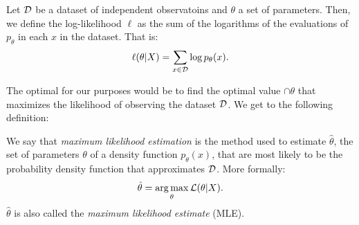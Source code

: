 \begin{ndef}
Let $\mathcal{D}$ be a dataset of independent observatoins and $\theta$ a set of parameters. Then, we define the log-likelihood $\ell$ as the sum of the logarithms of the evaluations of $p_\theta$ in each $x$ in the dataset. That is:
\[
\ell (\theta | X) = \sum_{x \in \mathcal{D}} \log p_\theta(x).
\]
\end{ndef}

The optimal for our purposes would be to find the optimal value $\cap{\theta}$ that maximizes the likelihood of observing the dataset $\mathcal{D}$. We get to the following definition:

\begin{ndef}
We say that \emph{maximum likelihood estimation} is the method used to estimate $\hat \theta$, the set of parameters $\theta$ of a density function
$p_\theta (x)$, that are most likely to be the probability density function that approximates $\mathcal{D}$. More formally:
$$
\hat \theta = \operatorname*{arg\,max}_{\theta} \mathcal L(\theta|X).
$$
$\hat\theta$ is also called the \emph{maximum likelihood estimate} (MLE).
\end{ndef}
